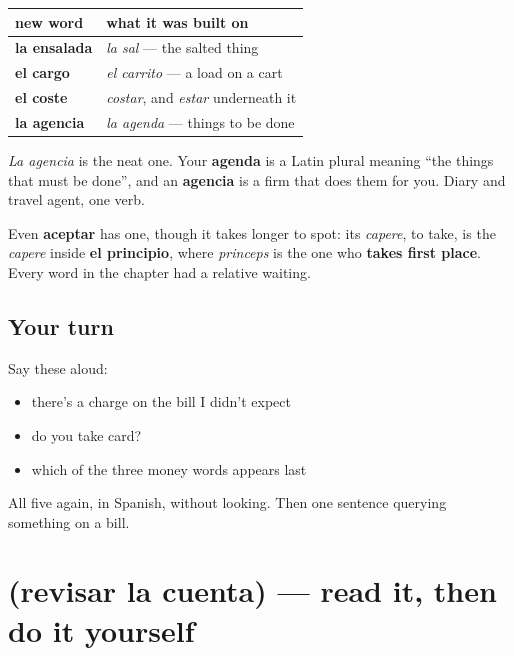\begin{grammarlens}[title={Grammar Lens: four of the five were relatives}]
\noindent
\begin{tabularx}{\linewidth}{@{}>{\raggedright\arraybackslash}X>{\raggedright\arraybackslash}X@{}}
\toprule
\textbf{new word} & \textbf{what it was built on} \\
\midrule
\textbf{la ensalada} & \emph{la sal} — the salted thing \\
\textbf{el cargo} & \emph{el carrito} — a load on a cart \\
\textbf{el coste} & \emph{costar}, and \emph{estar} underneath it \\
\textbf{la agencia} & \emph{la agenda} — things to be done \\
\bottomrule
\end{tabularx}

\emph{La agencia} is the neat one. Your \textbf{agenda} is a Latin plural meaning \textquotedblleft{}the things that must be done\textquotedblright{}, and an \textbf{agencia} is a firm that does them for you. Diary and travel agent, one verb.

Even \textbf{aceptar} has one, though it takes longer to spot: its \emph{capere}, to take, is the \emph{capere} inside \textbf{el principio}, where \emph{princeps} is the one who \textbf{takes first place}. Every word in the chapter had a relative waiting.
\end{grammarlens}

\subsection*{Your turn}
Say these aloud:

\begin{itemize}
\raggedright
  \item there's a charge on the bill I didn't expect
  \item do you take card?
  \item which of the three money words appears last
\end{itemize}

\begin{tcolorbox}[breakable,colback=teal!4,colframe=teal!35!black,title={Before you move on}]
All five again, in Spanish, without looking. Then one sentence querying something on a bill.
\end{tcolorbox}
\section[Practice]{(revisar la cuenta) — read it, then do it yourself}

